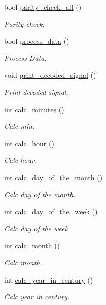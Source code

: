 \begin{DoxyCompactItemize}
\item 
bool \hyperlink{classdecoder_a38d771ce0c3b6cd655a15c9da7429ce7}{parity\+\_\+check\+\_\+all} ()
\begin{DoxyCompactList}\small\item\em Parity check. \end{DoxyCompactList}\item 
bool \hyperlink{classdecoder_afd5d052e769a29dcffcb2c6e70a2af6a}{process\+\_\+data} ()
\begin{DoxyCompactList}\small\item\em Process Data. \end{DoxyCompactList}\item 
void \hyperlink{classdecoder_a493f8f194f8978ebee93f2c9b2cc72e6}{print\+\_\+decoded\+\_\+signal} ()
\begin{DoxyCompactList}\small\item\em Print decoded signal. \end{DoxyCompactList}\item 
int \hyperlink{classdecoder_ae06eff4f336207d51211cf95a3bc73c4}{calc\+\_\+minutes} ()
\begin{DoxyCompactList}\small\item\em Calc min. \end{DoxyCompactList}\item 
int \hyperlink{classdecoder_a55e0f9fe052686fa8099d39a6825320a}{calc\+\_\+hour} ()
\begin{DoxyCompactList}\small\item\em Calc hour. \end{DoxyCompactList}\item 
int \hyperlink{classdecoder_a2c6f8505b9fefe24877c326d2daa8eb5}{calc\+\_\+day\+\_\+of\+\_\+the\+\_\+month} ()
\begin{DoxyCompactList}\small\item\em Calc day of the month. \end{DoxyCompactList}\item 
int \hyperlink{classdecoder_a3a8409bbca54e137d5d158def93b6763}{calc\+\_\+day\+\_\+of\+\_\+the\+\_\+week} ()
\begin{DoxyCompactList}\small\item\em Calc day of the week. \end{DoxyCompactList}\item 
int \hyperlink{classdecoder_a4b897e3c425b2e88bf4438052f4cdf73}{calc\+\_\+month} ()
\begin{DoxyCompactList}\small\item\em Calc month. \end{DoxyCompactList}\item 
int \hyperlink{classdecoder_ad30b5b7508493ad12df798da42046f14}{calc\+\_\+year\+\_\+in\+\_\+century} ()
\begin{DoxyCompactList}\small\item\em Calc year in century. \end{DoxyCompactList}\end{DoxyCompactItemize}


